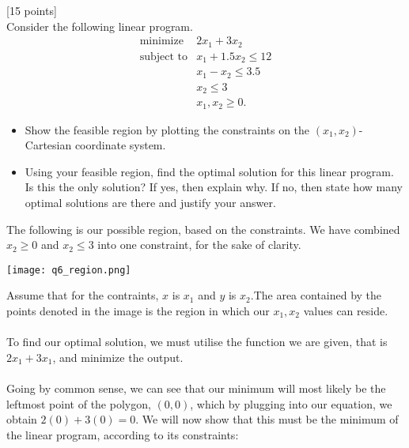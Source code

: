 \documentclass[12pt]{article}
\newcounter{ques}
\newenvironment{question}{\stepcounter{ques}{\noindent\bf Question \arabic{ques}:}}{\vspace{5mm}}
\begin{document}
	\begin{question}[15 points]\\
Consider the following linear program.
\begin{align*}
 & \text{minimize} & 2x_1+3x_2& \\
 & \text{subject to} & x_1+1.5x_2\leq 12\\
 &                   & x_1-x_2\leq 3.5\\
 &                   & x_2\leq 3\\
 &                   & x_1, x_2\geq 0.
\end{align*}
\begin{itemize}
    \item Show the feasible region by plotting the constraints on the $(x_1,x_2)$-Cartesian coordinate system.
    \item Using your feasible region, find the optimal solution for this linear program. Is this the only solution? If yes, then explain why. If no, then state how many optimal solutions are there and justify your answer.
\end{itemize}
The following is our possible region, based on the constraints. We have combined $x_2\geq 0$ and $x_2\leq3$ into one constraint, for the sake of clarity.\\
\begin{center}
\texttt{[image: q6\_region.png]}\\
\end{center}
Assume that for the contraints, $x$ is $x_1$ and $y$ is $x_2$.The area contained by the points denoted in the image is the region in which our $x_1,x_2$ values can reside.\\\\
To find our optimal solution, we must utilise the function we are given, that is $2x_1+3x_1$, and minimize the output.\\\\
Going by common sense, we can see that our minimum will most likely be the leftmost point of the polygon, $(0,0)$, which by plugging into our equation, we obtain $2(0)+3(0)=0$. We will now show that this must be the minimum of the linear program, according to its constraints:


\end{question}
\end{document}
